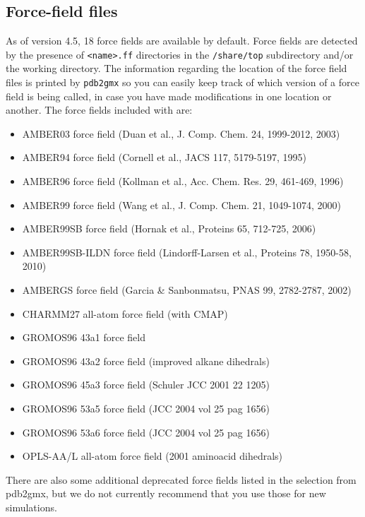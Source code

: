 \subsection{Force-field files}
\label{subsec:fffiles}
As of {\gromacs} version 4.5, 18 force fields are available by default.
Force fields are detected by the presence of {\tt <name>.ff} directories
in the {\gromacs} {\tt /share/top} subdirectory and/or the working directory.  
The information regarding the location of the force field files is printed
by {\tt pdb2gmx} so you can easily keep track of which version of a force field
is being called, in case you have made modifications in one location or another.
The force fields included with {\gromacs} are:

{\small
\begin{itemize}
 \item AMBER03 force field (Duan et al., J. Comp. Chem. 24, 1999-2012, 2003) 
 \item AMBER94 force field (Cornell et al., JACS 117, 5179-5197, 1995) 
 \item AMBER96 force field (Kollman et al., Acc. Chem. Res. 29, 461-469, 1996) 
 \item AMBER99 force field (Wang et al., J. Comp. Chem. 21, 1049-1074, 2000) 
 \item AMBER99SB force field (Hornak et al., Proteins 65, 712-725, 2006) 
 \item AMBER99SB-ILDN force field (Lindorff-Larsen et al., Proteins 78, 1950-58, 2010) 
 \item AMBERGS force field (Garcia \& Sanbonmatsu, PNAS 99, 2782-2787, 2002) 
 \item CHARMM27 all-atom force field (with CMAP) 
 \item GROMOS96 43a1 force field 
 \item GROMOS96 43a2 force field (improved alkane dihedrals) 
 \item GROMOS96 45a3 force field (Schuler JCC 2001 22 1205) 
 \item GROMOS96 53a5 force field (JCC 2004 vol 25 pag 1656) 
 \item GROMOS96 53a6 force field (JCC 2004 vol 25 pag 1656) 
 \item OPLS-AA/L all-atom force field (2001 aminoacid dihedrals) 
\end{itemize}} 
 
 There are also some additional deprecated force fields listed in the selection from
 pdb2gmx, but we do not currently recommend that you use those for new simulations.
 
